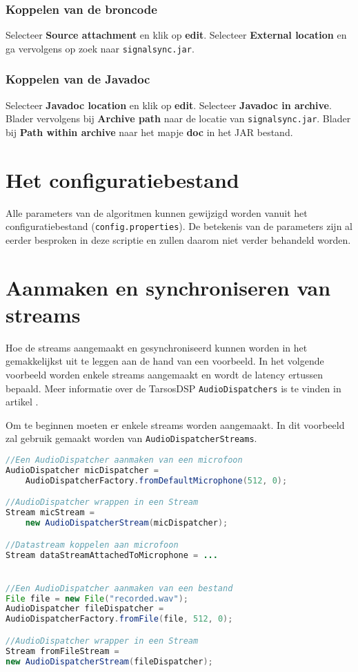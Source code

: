 \subsubsection{Koppelen van de broncode}

Selecteer \textbf{Source attachment} en klik op \textbf{edit}. Selecteer \textbf{External location} en ga vervolgens op zoek naar \texttt{signalsync.jar}.

\subsubsection{Koppelen van de Javadoc}

Selecteer \textbf{Javadoc location} en klik op \textbf{edit}. Selecteer \textbf{Javadoc in archive}. Blader vervolgens bij \textbf{Archive path} naar de locatie van \texttt{signalsync.jar}. Blader bij \textbf{Path within archive} naar het mapje \textbf{doc} in het JAR bestand.

\section*{Het configuratiebestand}

Alle parameters van de algoritmen kunnen gewijzigd worden vanuit het configuratiebestand (\texttt{config.properties}). De betekenis van de parameters zijn al eerder besproken in deze scriptie en zullen daarom niet verder behandeld worden.

\section*{Aanmaken en synchroniseren van streams}

Hoe de streams aangemaakt en gesynchroniseerd kunnen worden in het gemakkelijkst uit te leggen aan de hand van een voorbeeld. In het volgende voorbeeld worden enkele streams aangemaakt en wordt de latency ertussen bepaald. Meer informatie over de TarsosDSP \texttt{AudioDispatchers} is te vinden in artikel \cite{six2014tarsosdsp}.

Om te beginnen moeten er enkele streams worden aangemaakt. In dit voorbeeld zal gebruik gemaakt worden van \texttt{AudioDispatcherStreams}.

\begin{lstlisting}[language=java, frame=single,basicstyle=\linespread{0.5}]
//Een AudioDispatcher aanmaken van een microfoon
AudioDispatcher micDispatcher =
	AudioDispatcherFactory.fromDefaultMicrophone(512, 0);

//AudioDispatcher wrappen in een Stream
Stream micStream = 
	new AudioDispatcherStream(micDispatcher);

//Datastream koppelen aan microfoon
Stream dataStreamAttachedToMicrophone = ...


//Een AudioDispatcher aanmaken van een bestand
File file = new File("recorded.wav");
AudioDispatcher fileDispatcher = 
AudioDispatcherFactory.fromFile(file, 512, 0);

//AudioDispatcher wrapper in een Stream
Stream fromFileStream = 
new AudioDispatcherStream(fileDispatcher);	
\end{lstlisting}

